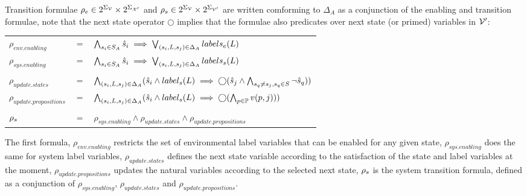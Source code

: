 Transition formulae ${\rho_e}  \in 2^{\Sigma_{{\mathcal{V}}}} \times 2^{\Sigma_{{\mathcal{X}}'}}$ and ${\rho_s}   \in 2^{\Sigma_{{\mathcal{V}}}} \times 2^{\Sigma_{{\mathcal{V}}'}}$ are written comforming to $\Delta_A$ as a conjunction of the enabling and transition formulae, note that the next state operator $\bigcirc$ implies that the formulae also predicates over next state (or primed) variables in ${\mathcal{V}}'$:

\vspace{1em}
\begin{tabular}{ l c l }
	$\rho_{env.enabling}$ &$=$& $\bigwedge_{s_i \in S_A} \hat{s}_{i} \implies \bigvee_{(s_i,L,s_j) \in \Delta_A}labels_e(L)$\\
	$\rho_{sys.enabling}$ &$=$& $\bigwedge_{s_i \in S_A} \hat{s}_{i} \implies \bigvee_{(s_i,L,s_j) \in \Delta_A}labels_s(L)$\\
	&&\\
	$\rho_{update.states}$&$=$&$\bigwedge_{(s_i,L,s_j) \in \Delta_A} (\hat{s}_{i} \wedge label_s(L) \implies \bigcirc(\hat{s}_{j} \wedge\bigwedge_{s_q \neq s_j, s_q \in S}\neg \hat{s}_{q}) ) $\\
	$\rho_{update.propositions}$&$=$&$\bigwedge_{(s_i,L,s_j) \in \Delta_A} (\hat{s}_{i} \wedge label_s(L) \implies \bigcirc(\bigwedge_{p \in \mathbb{P}}v(p,j) ) )$\\
	&&\\
	${\rho_s}$&$=$&$\rho_{sys.enabling} \wedge  \rho_{update.states} \wedge  \rho_{update.propositions}$\\	
\end{tabular}
\vspace{1em}

The first formula, $\rho_{env.enabling}$ restricts the set of environmental label variables that can be enabled for any given state, $\rho_{sys.enabling}$ does the same for system label variables, $\rho_{update.states}$ defines the next state variable according to the satisfaction of the state and label variables at the moment, $\rho_{update.propositions}$ updates the natural variables according to the selected next state, ${\rho_s}$ is the system transition formula, defined as a conjunction of $\rho_{sys.enabling}$, $\rho_{update.states}$ and $\rho_{update.propositions}$.
%
%

